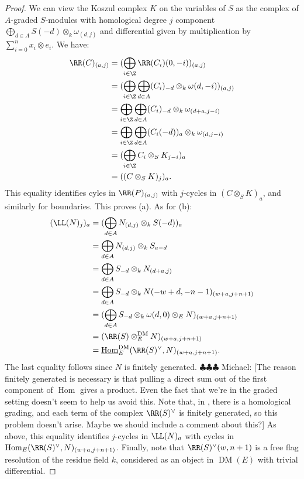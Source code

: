 \documentclass[12pt]{amsart}
\theoremstyle{definition}
\theoremstyle{remark}
\newcommand{\Hom}{\operatorname{Hom}} %
\newcommand{\michael}[1]{{\color{red} \sf $\clubsuit\clubsuit\clubsuit$ Michael: [#1]}}
\def\om{\omega}
\def\DM{\operatorname{DM}}
\def\om{\omega}
\begin{document}
\begin{proof}
We can view the Koszul complex $K$ on the variables of $S$ as the complex of $A$-graded $S$-modules with homological degree $j$ component $\bigoplus_{d \in A} S(-d) \otimes_k \om_{(d, j)}$ and differential  given by multiplication by $\sum_{i = 0}^n x_i \otimes e_i$. We have:
\begin{align*}
\RR(C)_{(a, j)} &= (\bigoplus_{ i \in \Z} \RR(C_i)(0,-i))_{(a, j)} \\
& = (\bigoplus_{i \in \Z} \bigoplus_{d \in A} (C_i)_{-d} \otimes_k \om(d, -i))_{(a, j)} \\ 
& = \bigoplus_{i \in \Z} \bigoplus_{d \in A} (C_i)_{-d} \otimes_k \om_{(d+a, j - i)} \\
& = \bigoplus_{i \in \Z} \bigoplus_{d \in A} (C_i(-d))_a \otimes_k \om_{(d, j - i)}  \\
& = (\bigoplus_{ i \in \Z} C_i \otimes_S K_{j - i})_a \\
& = ((C \otimes_S K)_{j})_a.
\end{align*}
This equality identifies cyles in $\RR(P)_{(a, j)}$ with $j$-cycles in $(C \otimes_S K)_a$, and similarly for boundaries. This proves (a). As for (b): 
\begin{align*}
(\LL(N)_j)_a &= (\bigoplus_{d \in A} N_{(d, j)} \otimes_k S(-d))_a\\
& = \bigoplus_{d \in A} N_{(d, j)} \otimes_k S_{a-d} \\
& = \bigoplus_{d \in A} S_{-d} \otimes_k N_{(d + a, j)} \\
& =  \bigoplus_{d \in A} S_{-d} \otimes_k N(-w + d , -n -1)_{(w + a, j + n + 1)} \\
& =  (\bigoplus_{d \in A} S_{-d} \otimes_k \om(d, 0) \otimes_E N)_{(w + a, j + n + 1)} \\
&= (\RR(S) \otimes^{\DM}_E N)_{(w + a, j + n + 1)} \\
&= \underline{\Hom}_E^{\DM}(\RR(S)^\vee, N)_{(w + a, j + n + 1)}. 
\end{align*}
The last equality follows since $N$ is finitely generated. \michael{The reason finitely generated is necessary is that pulling a direct sum out of the first component of $\Hom$ gives a product. Even the fact that we're in the graded setting doesn't seem to help us avoid this. Note that, in \cite{EFS}, there is a homological grading, and each term of the complex $\RR(S)^\vee$ is finitely generated, so this problem doesn't arise. Maybe we should include a comment about this?} As above, this equality identifies $j$-cycles in $\LL(N)_a$ with cycles in $\Hom_E(\RR(S)^\vee, N)_{(w + a, j + n + 1)}$. Finally, note that $\RR(S)^\vee(w, n+1)$ is a free flag resolution of the residue field $k$, considered as an object in $\DM(E)$ with trivial differential.
\end{proof}
\end{document}
